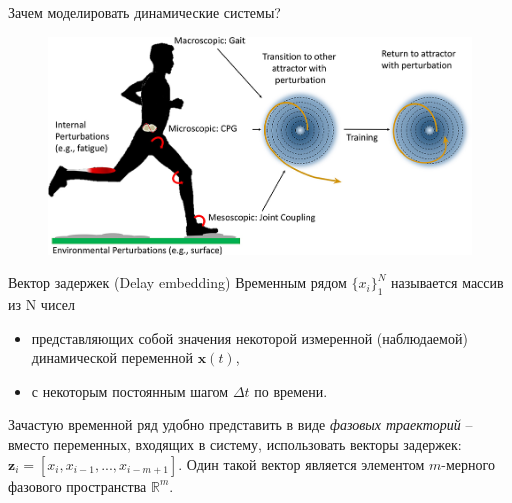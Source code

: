 \begin{frame}{Зачем моделировать динамические системы?}
\begin{figure}
    \centering
    \includegraphics[width=\textwidth]{lecture_4/figs/DS-1.jpg}
\end{figure}

\end{frame}
\begin{frame}{Вектор задержек (Delay embedding)}
Временным рядом $\{x_i\}_1^N $ называется массив из N чисел
\begin{itemize}
    \item представляющих собой значения некоторой измеренной (наблюдаемой) динамической переменной $\textbf{x}(t)$,
    \item с некоторым постоянным шагом $\Delta t$ по времени.
\end{itemize} 
 Зачастую временной ряд удобно представить в виде \textit{фазовых траекторий} 
-- вместо переменных, входящих в систему, использовать векторы задержек: $\mathbf{z}_i = [x_i, x_{i-1}, ..., x_{i-m+1}]$. Один такой вектор является элементом $m$-мерного фазового пространства $\mathbb{R}^m$.

\begin{figure}
    \centering
\end{figure}

\end{frame}
